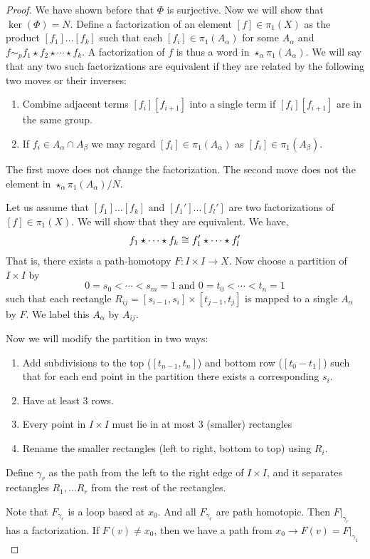 \documentclass[12pt]{amsart}
\begin{document}
\begin{proof}
    We have shown before that $\Phi$ is surjective. Now we will show that $\ker(\Phi) = N$. Define a factorization of an element $[f] \in \pi_1(X)$ as the product $[f_1] \ldots [f_k]$ such that each $[f_i] \in \pi_1(A_\alpha)$ for some $A_\alpha$ and $f \sim_p f_1 \star f_2 \star \cdots \star f_k$. 
    A factorization of $f$ is thus a word in $\star_\alpha \pi_1(A_\alpha)$. We will say that any two such factorizations are equivalent if they are related by the following two moves or their inverses: 
    \begin{enumerate}
        \item Combine adjacent terms $[f_i][f_{i+1}]$ into a single term if $[f_i][f_{i+1}]$ are in the same group. 
        \item If $f_i \in A_\alpha \cap A_\beta$ we may regard $[f_i] \in \pi_1(A_\alpha)$ as $[f_i] \in \pi_1(A_\beta)$. 
    \end{enumerate}
    The first move does not change the factorization. The second move does not the element in $\star_\alpha \pi_1(A_\alpha)/N$. 


    Let us assume that $[f_1]\ldots[f_k]$ and $[f_1']\ldots[f_l']$ are two factorizations of $[f] \in \pi_1(X)$. We will show that they are equivalent. 
    We have, 
    \[f_1 \star \cdots \star f_k \cong f_1' \star \cdots \star f_l'\]
    That is, there exists a path-homotopy $F: I \times I \to X$. Now choose a partition of $I \times I$ by 
    \[0 = s_0 < \cdots < s_m = 1 \text{ and } 0 = t_0 < \cdots < t_n = 1\]
    such that each rectangle $R_{ij} = [s_{i-1}, s_i] \times [t_{j-1}, t_j]$ is mapped to a single $A_\alpha$ by $F$. We label this $A_\alpha$ by $A_{ij}$. 
    
    Now we will modify the partition in two ways: 
    \begin{enumerate}
        \item Add subdivisions to the top ($[t_{n-1}, t_n]$) and bottom row ($[t_0 - t_1]$) such that for each end point in the partition there exists a corresponding $s_i$. 
        \item Have at least 3 rows. 
        \item Every point in $I \times I$ must lie in at most 3 (smaller) rectangles 
        \item Rename the smaller rectangles (left to right, bottom to top) using $R_i$.
    \end{enumerate}
    Define $\gamma_r$ as the path from the left to the right edge of $I \times I$, and it separates rectangles $R_1, \ldots R_r$ from the rest of the rectangles.
    
    Note that $F_{\gamma_r}$ is a loop based at $x_0$. And all $F_{\gamma_r}$ are path homotopic. Then $F|_{\gamma_r}$ has a factorization. If $F(v) \neq x_0$, then we have a path from $x_0 \to F(v) = F |_{\gamma_1}$ 
\end{proof}
\end{document}
